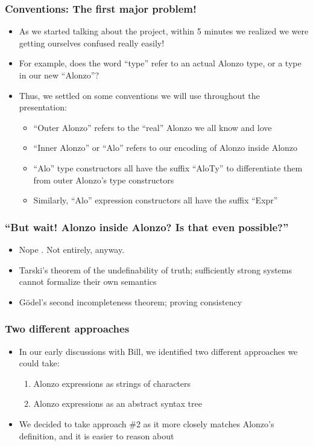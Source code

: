 \documentclass[xcolor={dvipsnames}]{beamer}
\begin{document}
\begin{frame}
\frametitle{Conventions: The first major problem!}
\begin{itemize}
\item As we started talking about the project, within 5 minutes we realized we were getting ourselves confused really easily!
\item For example, does the word ``type'' refer to an actual Alonzo type, or a type in our new ``Alonzo''?
\item Thus, we settled on some conventions we will use throughout the presentation:
    \begin{itemize}
    \item ``Outer Alonzo'' refers to the ``real'' Alonzo we all know and love
    \item ``Inner Alonzo'' or ``Alo'' refers to our encoding of Alonzo inside Alonzo
    \item ``Alo'' type constructors all have the suffix ``AloTy'' to differentiate them from outer Alonzo's type constructors
    \item Similarly, ``Alo'' expression constructors all have the suffix ``Expr''
    \end{itemize}
\end{itemize}
\end{frame}

\begin{frame}
\frametitle{``But wait! Alonzo inside Alonzo? Is that even possible?''}
\begin{itemize}
\item Nope \cite{smullyan1992godel}. Not entirely, anyway.
\item<only@2> Tarski's theorem of the undefinability of truth; sufficiently strong systems cannot formalize their own semantics
\item<only@2> G\"{o}del's second incompleteness theorem; proving consistency
\end{itemize}
\end{frame}

\begin{frame}
\frametitle{Two different approaches}
\begin{itemize}
\item In our early discussions with Bill, we identified two different approaches we could take:
    \begin{enumerate}
        \item Alonzo expressions as strings of characters
        \item Alonzo expressions as an abstract syntax tree
    \end{enumerate}
\item We decided to take approach \#2 as it more closely matches Alonzo's definition, and it is easier to
reason about
\end{itemize}
\end{frame}
\end{document}
